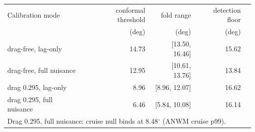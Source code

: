 \begin{tabular}{lrrrr}
\toprule
Calibration mode & conformal threshold & fold range & detection floor \\
 & (deg) & (deg) & (deg) \\
\midrule
drag-free, lag-only & 14.73 & [13.50, 16.46] & 15.62 \\
drag-free, full nuisance & 12.95 & [10.61, 13.76] & 13.84 \\
drag 0.295, lag-only & 8.96 & [8.96, 12.07] & 16.62 \\
drag 0.295, full nuisance & 6.46 & [5.84, 10.08] & 16.14 \\
\midrule
\multicolumn{4}{l}{\footnotesize Drag 0.295, full nuisance: cruise null binds at 8.48$^\circ$ (ANWM cruise p99).} \\
\bottomrule
\end{tabular}
